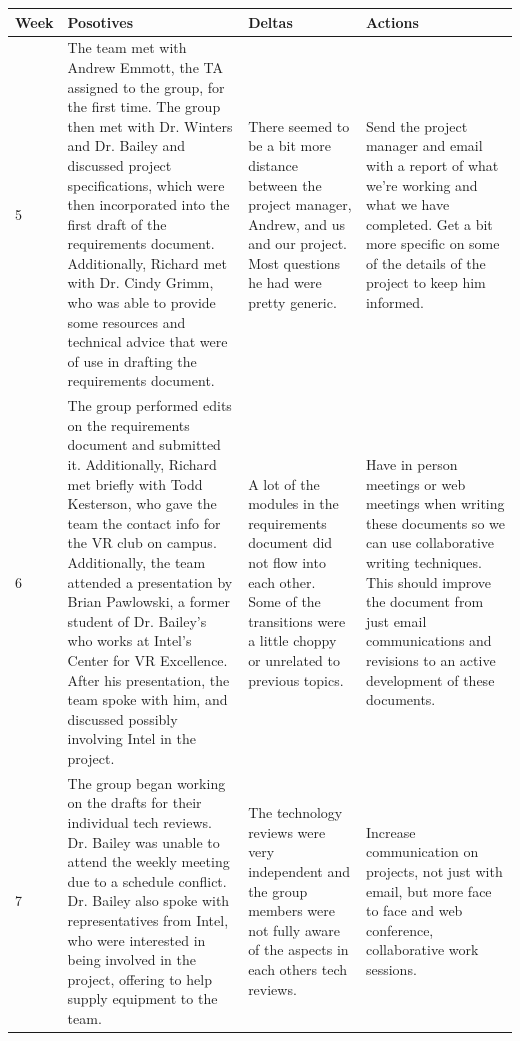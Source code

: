 \documentclass[onecolumn, draftclsnofoot,10pt, compsoc]{IEEEtran}
\begin{document}
\begin{center}
	\begin{tabular}{ | m{1cm} |m{5cm} | m{5cm}| m{5cm} | } 
		\hline
		Week & Posotives & Deltas & Actions \\ 
		\hline
		
		5 &
		The team met with Andrew Emmott, the TA assigned to the group, for the first time. The group then met with Dr. Winters and Dr. Bailey and discussed project specifications, which were then incorporated into the first draft of the requirements document. Additionally, Richard met with Dr. Cindy Grimm, who was able to provide some resources and technical advice that were of use in drafting the requirements document. &
		There seemed to be a bit more distance between the project manager, Andrew, and us and our project. Most questions he had were pretty generic.  &
		Send the project manager and email with a report of what we’re working and what we have completed. Get a bit more specific on some of the details of the project to keep him informed. \\
		\hline
		
		6 &
		The group performed edits on the requirements document and submitted it. Additionally, Richard met briefly with Todd Kesterson, who gave the team the contact info for the VR club on campus. Additionally, the team attended a presentation by Brian Pawlowski, a former student of Dr. Bailey’s who works at Intel’s Center for VR Excellence. After his presentation, the team spoke with him, and discussed possibly involving Intel in the project. &
		A lot of the modules in the requirements document did not flow into each other. Some of the transitions were a little choppy or unrelated to previous topics. &
		Have in person meetings or web meetings when writing these documents so we can use collaborative writing techniques. This should improve the document from just email communications and revisions to an active development of these documents. \\
		\hline
		
		7 &
		The group began working on the drafts for their individual tech reviews. Dr. Bailey was unable to attend the weekly meeting due to a schedule conflict. Dr. Bailey also spoke with representatives from Intel, who were interested in being involved in the project, offering to help supply equipment to the team. &
		The technology reviews were very independent and the group members were not fully aware of the aspects in each others tech reviews. &
		Increase communication on projects, not just with email, but more face to face and web conference, collaborative work sessions. \\
		\hline
		

\end{tabular}
\end{center}
\end{document}
